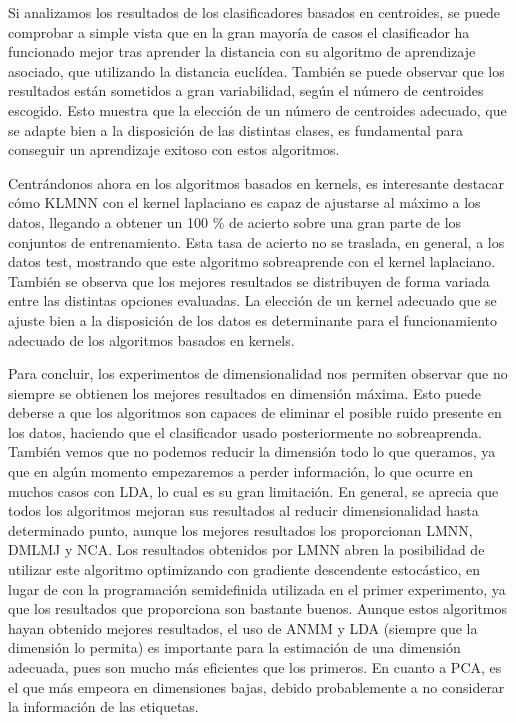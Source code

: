 Si analizamos los resultados de los clasificadores basados en centroides, se puede comprobar a simple vista que en la gran mayoría de casos el clasificador ha funcionado mejor tras aprender la distancia con su algoritmo de aprendizaje asociado, que utilizando la distancia euclídea. También se puede observar que los resultados están sometidos a gran variabilidad, según el número de centroides escogido. Esto muestra que la elección de un número de centroides adecuado, que se adapte bien a la disposición de las distintas clases, es fundamental para conseguir un aprendizaje exitoso con estos algoritmos.

Centrándonos ahora en los algoritmos basados en kernels, es interesante destacar cómo KLMNN con el kernel laplaciano es capaz de ajustarse al máximo a los datos, llegando a obtener un 100 \% de acierto sobre una gran parte de los conjuntos de entrenamiento. Esta tasa de acierto no se traslada, en general, a los datos test, mostrando que este algoritmo sobreaprende con el kernel laplaciano. También se observa que los mejores resultados se distribuyen de forma variada entre las distintas opciones evaluadas. La elección de un kernel adecuado que se ajuste bien a la disposición de los datos es determinante para el funcionamiento adecuado de los algoritmos basados en kernels.

Para concluir, los experimentos de dimensionalidad nos permiten observar que no siempre se obtienen los mejores resultados en dimensión máxima. Esto puede deberse a que los algoritmos son capaces de eliminar el posible ruido presente en los datos, haciendo que el clasificador usado posteriormente no sobreaprenda. También vemos que no podemos reducir la dimensión todo lo que queramos, ya que en algún momento empezaremos a perder información, lo que ocurre en muchos casos con LDA, lo cual es su gran limitación. En general, se aprecia que todos los algoritmos mejoran sus resultados al reducir dimensionalidad hasta determinado punto, aunque los mejores resultados los proporcionan LMNN, DMLMJ y NCA. Los resultados obtenidos por LMNN abren la posibilidad de utilizar este algoritmo optimizando con gradiente descendente estocástico, en lugar de con la programación semidefinida utilizada en el primer experimento, ya que los resultados que proporciona son bastante buenos. Aunque estos algoritmos hayan obtenido mejores resultados, el uso de ANMM y LDA (siempre que la dimensión lo permita) es importante para la estimación de una dimensión adecuada, pues son mucho más eficientes que los primeros. En cuanto a PCA, es el que más empeora en dimensiones bajas, debido probablemente a no considerar la información de las etiquetas.

